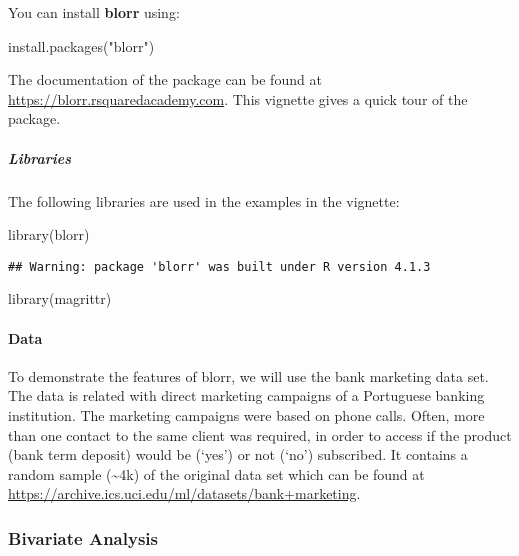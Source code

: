 \documentclass[
]{article}
\newenvironment{Shaded}{\begin{snugshade}}{\end{snugshade}}
\newcommand{\FunctionTok}[1]{\textcolor[rgb]{0.00,0.00,0.00}{#1}}
\newcommand{\NormalTok}[1]{#1}
\newcommand{\StringTok}[1]{\textcolor[rgb]{0.31,0.60,0.02}{#1}}
\begin{document}
You can install \textbf{blorr} using:

\begin{Shaded}
\begin{Highlighting}[]
\FunctionTok{install.packages}\NormalTok{(}\StringTok{"blorr"}\NormalTok{)}
\end{Highlighting}
\end{Shaded}

The documentation of the package can be found at
\url{https://blorr.rsquaredacademy.com}. This vignette gives a quick
tour of the package.

\hypertarget{libraries}{%
\subparagraph{Libraries}\label{libraries}}

The following libraries are used in the examples in the vignette:

\begin{Shaded}
\begin{Highlighting}[]
\FunctionTok{library}\NormalTok{(blorr)}
\end{Highlighting}
\end{Shaded}

\begin{verbatim}
## Warning: package 'blorr' was built under R version 4.1.3
\end{verbatim}

\begin{Shaded}
\begin{Highlighting}[]
\FunctionTok{library}\NormalTok{(magrittr)}
\end{Highlighting}
\end{Shaded}

\hypertarget{data}{%
\paragraph{Data}\label{data}}

To demonstrate the features of blorr, we will use the bank marketing
data set. The data is related with direct marketing campaigns of a
Portuguese banking institution. The marketing campaigns were based on
phone calls. Often, more than one contact to the same client was
required, in order to access if the product (bank term deposit) would be
(`yes') or not (`no') subscribed. It contains a random sample
(\textasciitilde4k) of the original data set which can be found at
\url{https://archive.ics.uci.edu/ml/datasets/bank+marketing}.

\hypertarget{bivariate-analysis}{%
\subsubsection{Bivariate Analysis}\label{bivariate-analysis}}
\end{document}
